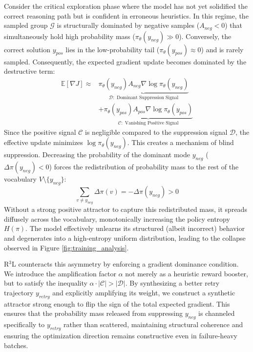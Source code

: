 Consider the critical exploration phase where the model has not yet solidified the correct reasoning path but is confident in erroneous heuristics. In this regime, the sampled group $\mathcal{G}$ is structurally dominated by negative samples ($A_{neg} < 0$) that simultaneously hold high probability mass ($\pi_\theta(y_{neg}) \gg 0$). Conversely, the correct solution $y_{pos}$ lies in the low-probability tail ($\pi_\theta(y_{pos}) \approx 0$) and is rarely sampled. Consequently, the expected gradient update becomes dominated by the destructive term:
\begin{equation}
\begin{split}
\mathbb{E}[\nabla J] \approx &\underbrace{\pi_\theta(y_{neg}) A_{neg} \nabla \log \pi_\theta(y_{neg})}_{\mathcal{D}: \text{ Dominant Suppression Signal}} \\
&+ \underbrace{\pi_\theta(y_{pos}) A_{pos} \nabla \log \pi_\theta(y_{pos})}_{\mathcal{C}: \text{ Vanishing Positive Signal}}
\end{split}
\end{equation}
Since the positive signal $\mathcal{C}$ is negligible compared to the suppression signal $\mathcal{D}$, the effective update minimizes $\log \pi_\theta(y_{neg})$. This creates a mechanism of blind suppression. Decreasing the probability of the dominant mode $y_{neg}$ ($\Delta \pi(y_{neg}) < 0$) forces the redistribution of probability mass to the rest of the vocabulary $V \setminus \{y_{neg}\}$:
\begin{equation}
\sum_{v \neq y_{neg}} \Delta \pi(v) = - \Delta \pi(y_{neg}) > 0
\end{equation}
Without a strong positive attractor to capture this redistributed mass, it spreads diffusely across the vocabulary, monotonically increasing the policy entropy $H(\pi)$. The model effectively unlearns its structured (albeit incorrect) behavior and degenerates into a high-entropy uniform distribution, leading to the collapse observed in Figure \ref{fig:training_analysis}.

R$^3$L counteracts this asymmetry by enforcing a gradient dominance condition. We introduce the amplification factor $\alpha$ not merely as a heuristic reward booster, but to satisfy the inequality $\alpha \cdot |\mathcal{C}| > |\mathcal{D}|$. By synthesizing a better retry trajectory $y_{retry}$ and explicitly amplifying its weight, we construct a synthetic attractor strong enough to flip the sign of the total expected gradient. This ensures that the probability mass released from suppressing $y_{neg}$ is channeled specifically to $y_{retry}$ rather than scattered, maintaining structural coherence and ensuring the optimization direction remains constructive even in failure-heavy batches.
